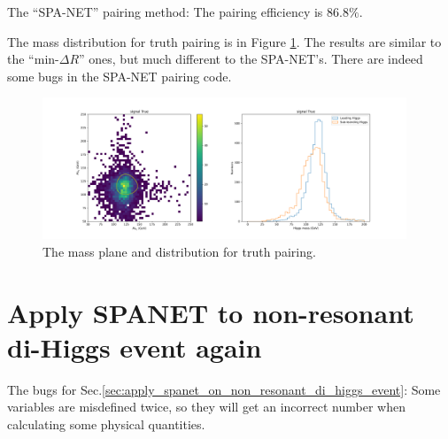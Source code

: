 \documentclass[12pt]{article}
\begin{document}
	The ``SPA-NET'' pairing method:  The pairing efficiency is  $86.8 \%$.

	The mass distribution for truth pairing is in Figure \ref{fig:Higgs_mass_new_truth}. The results are similar to the ``$\text{min-}\Delta R$'' ones, but much different to the SPA-NET's. There are indeed some bugs in the SPA-NET pairing code.
		\begin{figure}[htpb]
			\centering
			\includegraphics[width=0.97\textwidth]{Higgs_mass_new_truth_s.png}
			\caption{The mass plane and distribution for truth pairing.}
			\label{fig:Higgs_mass_new_truth}
		\end{figure}

\section{Apply SPANET to non-resonant di-Higgs event again}%
\label{sec:apply_spanet_to_non_resonant_di_higgs_event_again}
	The bugs for Sec.\ref{sec:apply_spanet_on_non_resonant_di_higgs_event}: Some variables are misdefined twice, so they will get an incorrect number when calculating some physical quantities. 
\end{document}
